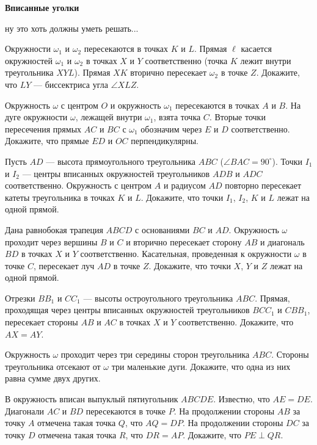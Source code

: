 \centerline{\bf \Huge Вписанные уголки}

\begin{flushright}
        \scriptsize{ну это хоть должны уметь решать...}
\end{flushright}

Окружности $\omega_1$ и $\omega_2$ пересекаются в точках $K$ и $L$. Прямая $\ell$ касается окружностей $\omega_1$ и $\omega_2$ в точках $X$ и $Y$ соответственно (точка $K$ лежит внутри треугольника $XYL$). Прямая $XK$ вторично пересекает $\omega_2$ в точке $Z$. Докажите, что $LY$ --- биссектриса угла $\angle XLZ$.

Окружность $\omega$ с центром $O$ и окружность $\omega_1$ пересекаются в точках $A$ и $B$. На дуге окружности $\omega$, лежащей внутри $\omega_1$, взята точка $C$. Вторые точки пересечения прямых $AC$ и $BC$ с $\omega_1$ обозначим через $E$ и $D$ соответственно. Докажите, что прямые $ED$ и $OC$ перпендикулярны.

Пусть $AD$ --- высота прямоугольного треугольника $ABC$ ($\angle BAC=90^\circ$). Точки $I_1$ и $I_2$ --- центры вписанных окружностей треугольников $ADB$ и $ADC$ соответственно. Окружность с центром $A$ и радиусом $AD$ повторно пересекает катеты треугольника в точках $K$ и $L$. Докажите, что точки $I_1$, $I_2$, $K$ и $L$ лежат на одной прямой.

Дана равнобокая трапеция $ABCD$ с основаниями $BC$ и $AD$. Окружность $\omega$ проходит через вершины $B$ и $C$ и вторично пересекает сторону $AB$ и диагональ $BD$ в точках $X$ и $Y$ соответственно. Касательная, проведенная к окружности $\omega$ в точке $C$, пересекает луч $AD$ в точке $Z$. Докажите, что точки $X$, $Y$ и $Z$ лежат на одной прямой.

Отрезки $BB_1$ и $CC_1$ --- высоты остроугольного треугольника $ABC$. Прямая, проходящая через центры вписанных окружностей треугольников $BCC_1$ и $CBB_1$, пересекает стороны $AB$ и $AC$ в точках $X$ и $Y$ соответственно. Докажите, что $AX=AY$.

Окружность $\omega$ проходит через три середины сторон треугольника $ABC$. Стороны треугольника отсекают от $\omega$ три маленькие дуги. Докажите, что одна из них равна сумме двух других.

В окружность вписан выпуклый пятиугольник $ABCDE$. Известно, что $AE=DE$. Диагонали $AC$ и $BD$ пересекаются в точке $P$. На продолжении стороны $AB$ за точку $A$ отмечена такая точка $Q$, что $AQ=DP$. На продолжении стороны $DC$ за точку $D$ отмечена такая точка $R$, что $DR=AP$. Докажите, что $PE\perp QR$.

